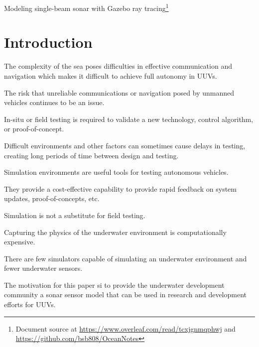 \documentclass[11pt]{article}
\newcommand{\doctitle}{Modeling single-beam sonar with Gazebo ray tracing}
\begin{document}
\setlength{\IEEEnormaljot}{10pt}%


\newcommand{\SF}{0.7}
\newcommand{\SFb}{0.45}
\newcommand{\SFPic}{0.45}
\newcommand{\SFPlot}{0.45}
\newcommand{\SFc}{0.52}
\newcommand{\FigWidth}{\SF}


\newpage
\setcounter{page}{1}
\begin{center}
{\huge \doctitle}\footnote{Document source at \url{https://www.overleaf.com/read/tcxjgnmqphwj} and \url{https://github.com/bsb808/OceanNotes}}
\end{center}

\section{Introduction}
The complexity of the sea poses difficulties in effective communication and navigation which makes it difficult to achieve full autonomy in UUVs. 

The risk that unreliable communications or navigation posed by unmanned vehicles continues to be an issue.

In-situ or field testing is required to validate a new technology, control algorithm, or proof-of-concept. 

Difficult environments and other factors can sometimes cause delays in testing, creating long periods of time between design and testing.

Simulation environments are useful tools for testing autonomous vehicles. 

They provide a cost-effective capability to provide rapid feedback on system updates, proof-of-concepts, etc.

Simulation is not a substitute for field testing.

Capturing the physics of the underwater environment is computationally expensive.

There are few simulators capable of simulating an underwater environment and fewer underwater sensors.

The motivation for this paper si to provide the underwater development community a sonar sensor model that can be used in research and development efforts for UUVs. 
\end{document}

